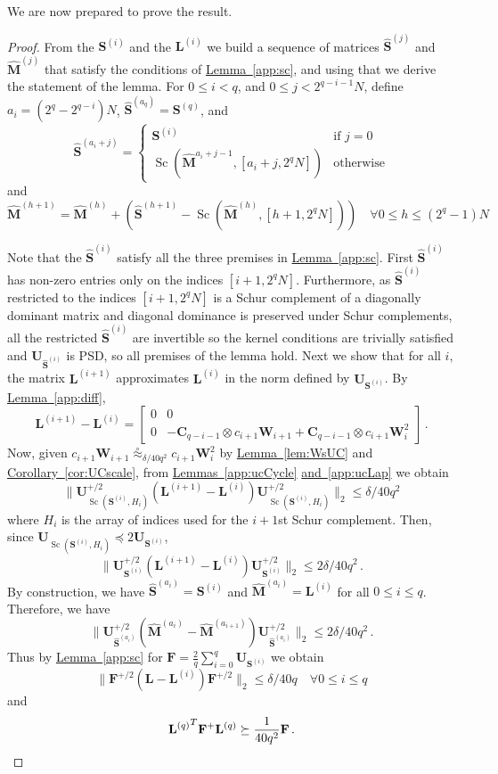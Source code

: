 \documentclass[11pt]{article}
\numberwithin{equation}{section}
\theoremstyle{definition}
\theoremstyle{plain}
\newcommand{\expref}[2]{\hyperref[#2]{#1~\ref{#2}}}
\newcommand{\mC}{\mathbf{C}}
\newcommand{\mU}{\mathbf{U}}
\newcommand{\mS}{\mathbf{S}}
\newcommand{\mF}{\mathbf{F}}
\newcommand{\mW}{\mathbf{W}}
\newcommand{\mL}{\mathbf{L}}
\newcommand{\hS}{\hat{\mathbf{S}}}    %
\newcommand{\hM}{\hat{\mathbf{M}}}    %
\newcommand{\sym}[1][ ]{\mU_{#1}}
\DeclareMathOperator{\Sc}{Sc}
\newcommand{\Lq}{\mathbf{L}^{(q)}}
\newcommand{\uc}{\stackrel{\circ}{\approx}}
\begin{document}
We are now prepared to prove the result.
\AKMsmall*
\begin{proof}
From the %
%
$\mS^{(i)}$ and the $\mL^{(i)}$  %
we build a sequence of    
%
%
%
matrices $\hS^{(j)}$ and $\hM^{(j)}$ %
%
that satisfy the conditions of \expref{Lemma}{app:sc}, and using that we derive
the statement of the lemma. For $0\leq i < q$, and $0\leq j <2^{q-i-1}N$, define
$a_i= (2^q-2^{q-i})N$, $\hS^{(a_q)}=\mS^{(q)}$, 
and
\[ 
\hS^{(a_i+j)} = \begin{cases}
\mS^{(i)} & \text{if } j=0\\
\Sc(\hM^{a_i+j-1},[a_i+j,2^qN]) & \text{otherwise}\end{cases}\]
and
$$\hM^{(h+1)} = \hM^{(h)}+(\hS^{(h+1)}-\Sc(\hM^{(h)},[h+1,2^qN])) \quad \forall 0\leq h \leq (2^q-1)N$$

Note that the %
$\hS^{(i)}$  %
satisfy all the three premises in \expref{Lemma}{app:sc}. First $\hS^{(i)}$ has non-zero entries only on the indices $[i+ 1,2^q N]$. Furthermore, as $\hS^{(i)}$ restricted to the indices $[i+ 1,2^q N]$ is a Schur complement of a diagonally dominant matrix
%
%
and diagonal dominance is preserved under Schur complements, %
%
%
%
all the restricted %
$\hS^{(i)}$   %
are invertible so the kernel %
conditions  %
are trivially satisfied and $\sym[\hS^{(i)}]$ is PSD, so all premises of the lemma hold. 
Next we show that for all %
$i$,  %
the matrix %
%
$\mL^{(i+1)}$ approximates $\mL^{(i)}$ in the norm defined by $\sym[\mS^{(i)}]$.  By
\expref{Lemma}{app:diff},
$$\mL^{(i+1)}-\mL^{(i)} = \begin{bmatrix} 0 & 0\\ 0 & -\mC_{q-i-1}\otimes c_{i+1}\mW_{i+1}+\mC_{q-i-1}\otimes c_{i+1}\mW_{i}^2\end{bmatrix}\,.$$  %
Now, given $c_{i+1}\mW_{i+1} \uc_{\delta/40q^2}c_{i+1}\mW_{i}^2$ by \expref{Lemma}{lem:WsUC} and
\expref{Corollary}{cor:UCscale}, from
%
\expref{Lemmas}{app:ucCycle} \expref{and}{app:ucLap} %
%
we obtain
\[\|\sym[\Sc(\mS^{(i)},H_i)]^{+/2}(\mL^{(i+1)}-\mL^{(i)})\sym[{\Sc(\mS^{(i)},H_i)}]^{+/2}\|_2 \leq \delta/40q^2\]
where $H_i$
%
is the array of %
indices used for the $i+1$st Schur complement. %
Then,  %
since $\sym[\Sc(\mS^{(i)},H_i)] \preceq 2\sym[\mS^{(i)}]$,
\[\|\sym[{\mS^{(i)}}]^{+/2}(\mL^{(i+1)}-\mL^{(i)})\sym[{\mS^{(i)}}]^{+/2}\|_2 \leq 2\delta/40q^2\,.\]
%
By construction, we have $\hS^{(a_i)}=\mS^{(i)}$ and $\hM^{(a_i)}=\mL^{(i)}$ for all $0\leq i\leq q$. Therefore, we have
$$\|\sym[\hS^{(a_i)}]^{+/2}(\hM^{(a_{i})}-\hM^{(a_{i+1})})\sym[\hS^{(a_i)}]^{+/2}\|_2 \leq 2\delta/40q^2 \,.$$ %
Thus by \expref{Lemma}{app:sc} for $\mF=\frac{2}{q}\sum_{i=0}^q \sym[\mS^{(i)}]$ we obtain
\[\|\mF^{+/2}(\mL-\mL^{(i)})\mF^{+/2}\|_2\leq \delta/40q \quad \forall 0\leq i\leq q\]
and 
\[{\Lq}^T\mF^+\Lq \succeq \frac{1}{40q^2}\mF\,. \qedhere\] 
%
\end{proof}
\end{document}
